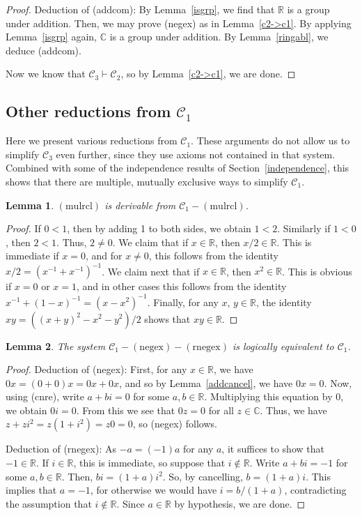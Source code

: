 \documentclass{article}
\newcommand\bC{\mathbb{C}}
\newcommand\bR{\mathbb{R}}
\newcommand\cC{\mathcal{C}}
\newtheorem{lemma}{Lemma}[section]
\begin{document}
\begin{proof}
Deduction of (addcom): By Lemma~\ref{isgrp}, we find that $\bR$ is a group under addition. Then, we may prove (negex) as in Lemma~\ref{c2->c1}. By applying Lemma~\ref{isgrp} again, $\bC$ is a group under addition. By Lemma~\ref{ringabl}, we deduce (addcom).

Now we know that $\cC_3 \vdash \cC_2$, so by Lemma~\ref{c2->c1}, we are done.
\end{proof}

\subsection{Other reductions from $\cC_1$}

Here we present various reductions from $\cC_1$. These arguments do not allow us to simplify $\cC_3$ even further, since they use axioms not contained in that system. Combined with some of the independence results of Section~\ref{independence}, this shows that there are multiple, mutually exclusive ways to simplify $\cC_1$.

\begin{lemma}
$\mathrm{(mulrcl)}$ is derivable from $\cC_1 - \mathrm{(mulrcl)}$.
\end{lemma}
\begin{proof}
If $0 < 1$, then by adding 1 to both sides, we obtain $1 < 2$. Similarly if $1 < 0$, then $2 < 1$. Thus, $2 \ne 0$.
We claim that if $x \in \bR$, then $x/2 \in \bR$. This is immediate if $x = 0$, and for $x \ne 0$, this follows from the identity $x/2 = (x^{-1} + x^{-1})^{-1}$.
We claim next that if $x \in \bR$, then $x^2 \in \bR$. This is obvious if $x = 0$ or $x = 1$, and in other cases this follows from the identity $x^{-1} + (1-x)^{-1} = (x - x^2)^{-1}$.
Finally, for any $x$, $y \in \bR$, the identity $xy = ((x+y)^2 - x^2 - y^2)/2$ shows that $xy \in \bR$.
\end{proof}

\begin{lemma}
The system $\cC_1 - \mathrm{(negex)} - \mathrm{(rnegex)}$ is logically equivalent to $\cC_1$.
\end{lemma}
\begin{proof}
Deduction of (negex): First, for any $x \in \bR$, we have $0x = (0+0)x = 0x + 0x$, and so by Lemma~\ref{addcancel}, we have $0x = 0$. Now, using (cnre), write $a + bi = 0$ for some $a,b \in \bR$. Multiplying this equation by $0$, we obtain $0i = 0$. From this we see that $0z = 0$ for all $z \in \bC$. Thus, we have $z + zi^2 = z(1 + i^2) = z0 = 0$, so (negex) follows.

Deduction of (rnegex): As $-a = (-1)a$ for any $a$, it suffices to show that $-1 \in \bR$. If $i \in \bR$, this is immediate, so suppose that $i \notin \bR$. Write $a + bi = -1$ for some $a,b \in \bR$. Then, $bi = (1 + a)i^2$. So, by cancelling, $b = (1+a)i$. This implies that $a = -1$, for otherwise we would have $i = b/(1+a)$, contradicting the assumption that $i \notin \bR$. Since $a \in \bR$ by hypothesis, we are done.
\end{proof}
\end{document}
